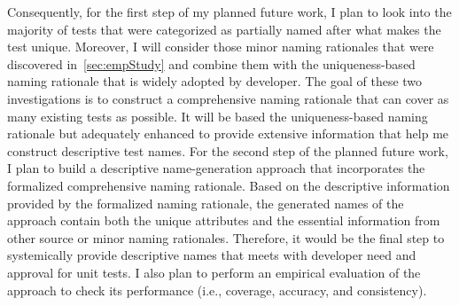 Consequently, for the first step of my planned future work, I plan to look into the majority of tests that were categorized as partially named after what makes the test unique.
%
Moreover, I will consider those minor naming rationales that were discovered in~\cref{sec:empStudy} and combine them with the uniqueness-based naming rationale that is widely adopted by developer.
%
The goal of these two investigations is to construct a comprehensive naming rationale that can cover as many existing tests as possible.
%
It will be based the uniqueness-based naming rationale but adequately enhanced to provide extensive information that help me construct descriptive test names.
%
For the second step of the planned future work, I plan to build a descriptive name-generation approach that incorporates the formalized comprehensive naming rationale.
%
Based on the descriptive information provided by the formalized naming rationale, the generated names of the approach contain both the unique attributes and the essential information from other source or minor naming rationales.
%
Therefore, it would be the final step to systemically provide descriptive names that meets with developer need and approval for unit tests.
%
I also plan to perform an empirical evaluation of the approach to check its performance (i.e., coverage, accuracy, and consistency).

